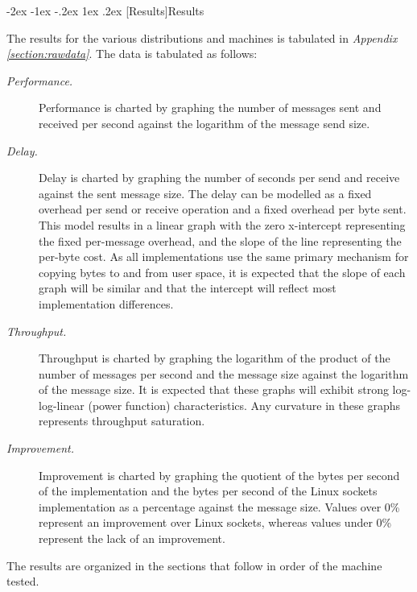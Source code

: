 \documentclass[letterpaper,final,notitlepage,twocolumn,10pt,twoside]{article}
\makeatletter
\let\large = \normalsize
\let\normalsize = \small
\let\small = \footnotesize
\let\footnotesize = \scriptsize
\let\scriptsize = \tiny
\renewcommand\section{\@startsection {section}{1}{\z@}%
                                   {-2ex \@plus -1ex \@minus -.2ex}%
                                   {1ex \@plus .2ex}%
                                   {\normalfont\large\bfseries}}
\makeatother
\begin{document}
\section[Results]{Results}

The results for the various distributions and machines is tabulated in \textit{Appendix
\ref{section:rawdata}}.  The data is tabulated as follows:

\begin{description}

\item[{\it Performance.}]

Performance is charted by graphing the number of messages sent and received per second against the
logarithm of the message send size.

\item[{\it Delay.}]

Delay is charted by graphing the number of seconds per send and receive against the sent message
size.  The delay can be modelled as a fixed overhead per send or receive operation and a fixed
overhead per byte sent.  This model results in a linear graph with the zero x-intercept representing
the fixed per-message overhead, and the slope of the line representing the per-byte cost.  As all
implementations use the same primary mechanism for copying bytes to and from user space, it is
expected that the slope of each graph will be similar and that the intercept will reflect most
implementation differences.

\item[{\it Throughput.}]

Throughput is charted by graphing the logarithm of the product of the number of messages per second
and the message size against the logarithm of the message size.  It is expected that these graphs
will exhibit strong log-log-linear (power function) characteristics.  Any curvature in these graphs
represents throughput saturation.

\item[{\it Improvement.}]

Improvement is charted by graphing the quotient of the bytes per second of the implementation and
the bytes per second of the Linux sockets implementation as a percentage against the message size.
Values over 0\% represent an improvement over Linux sockets, whereas values under 0\% represent the
lack of an improvement.

\end{description}

The results are organized in the sections that follow in order of the machine tested.
\end{document}
